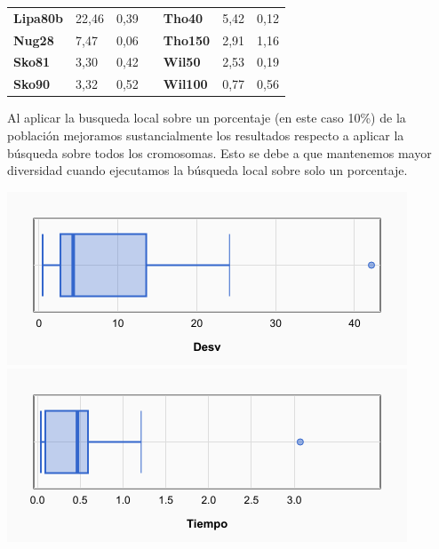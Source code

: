\documentclass[a4paper, 12pt]{article}
\begin{document}
\begin{table}[H]
\begin{tabular}{|l|l|l|l|l|l|l|}
\textbf{Lipa80b}                    & 22,46                              & 0,39                                 &                       & \textbf{Tho40}                     & 5,42                               & 0,12                                 \\ \cline{1-3} \cline{5-7} 
\textbf{Nug28}                      & 7,47                               & 0,06                                 &                       & \textbf{Tho150}                    & 2,91                               & 1,16                                 \\ \cline{1-3} \cline{5-7} 
\textbf{Sko81}                      & 3,30                               & 0,42                                 &                       & \textbf{Wil50}                     & 2,53                               & 0,19                                 \\ \cline{1-3} \cline{5-7} 
\textbf{Sko90}                      & 3,32                               & 0,52                                 &                       & \textbf{Wil100}                    & 0,77                               & 0,56                                 \\ \cline{1-3} \cline{5-7} 
\end{tabular}
\end{table}

	Al aplicar la busqueda local sobre un porcentaje (en este caso 10\%) de la población mejoramos sustancialmente los resultados respecto a aplicar la búsqueda sobre todos los cromosomas. Esto se debe a que mantenemos mayor diversidad cuando ejecutamos la búsqueda local sobre solo un porcentaje.

\begin{center}
         \includegraphics[scale=0.5]{boxplot-am(1-01)-desv}
         \includegraphics[scale=0.5]{boxplot-am(1-01)-time}
      \end{center}
      
\end{document}
